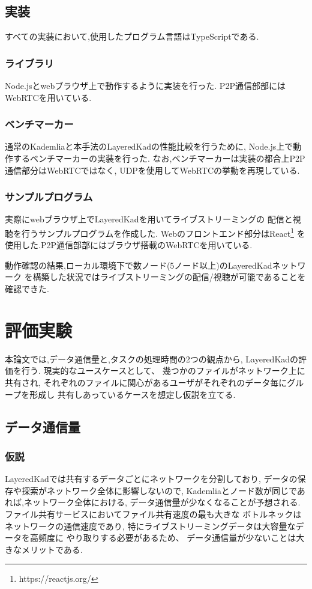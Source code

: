 \documentclass[sotsuron]{jcsie}
\begin{document}
\section{実装}
すべての実装において,使用したプログラム言語はTypeScriptである.

\subsection{ライブラリ}
Node.jsとwebブラウザ上で動作するように実装を行った.
P2P通信部部にはWebRTCを用いている.

\subsection{ベンチマーカー}
通常のKademliaと本手法のLayeredKadの性能比較を行うために,
Node.js上で動作するベンチマーカーの実装を行った.
なお,ベンチマーカーは実装の都合上P2P通信部分はWebRTCではなく,
UDPを使用してWebRTCの挙動を再現している.

\subsection{サンプルプログラム}
実際にwebブラウザ上でLayeredKadを用いてライブストリーミングの
配信と視聴を行うサンプルプログラムを作成した.
Webのフロントエンド部分はReact\footnote{https://reactjs.org/}
を使用した.P2P通信部部にはブラウザ搭載のWebRTCを用いている.

動作確認の結果,ローカル環境下で数ノード(5ノード以上)のLayeredKadネットワーク
を構築した状況ではライブストリーミングの配信/視聴が可能であることを
確認できた.

\chapter{評価実験}
本論文では,データ通信量と,タスクの処理時間の2つの観点から,
LayeredKadの評価を行う.
現実的なユースケースとして、
幾つかのファイルがネットワーク上に共有され,
それぞれのファイルに関心があるユーザがそれぞれのデータ毎にグループを形成し
共有しあっているケースを想定し仮説を立てる.

\section{データ通信量}
\subsection{仮説}
LayeredKadでは共有するデータごとにネットワークを分割しており,
データの保存や探索がネットワーク全体に影響しないので,
Kademliaとノード数が同じであれば,ネットワーク全体における,
データ通信量が少なくなることが予想される.
ファイル共有サービスにおいてファイル共有速度の最も大きな
ボトルネックはネットワークの通信速度であり,
特にライブストリーミングデータは大容量なデータを高頻度に
やり取りする必要があるため、
データ通信量が少ないことは大きなメリットである.
\end{document}
